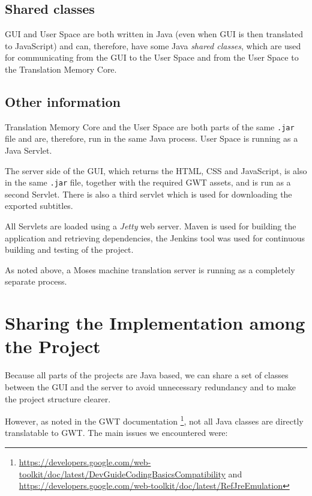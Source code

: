 \subsection*{Shared classes}

GUI and User Space are both written in Java (even when GUI is then translated to JavaScript) and can, therefore, have some Java \emph{shared classes}, which are used for communicating from the GUI to the User Space and from the User Space to the Translation Memory Core.


\subsection*{Other information}

Translation Memory Core and the User Space are both parts of the same \texttt{.jar} file and are, therefore, run in the same Java process. User Space is running as a Java Servlet.

The server side of the GUI, which returns the HTML, CSS and JavaScript, is also in the same \texttt{.jar} file, together with the required GWT assets, and is run as a second Servlet. There is also a third servlet which is used for downloading the exported subtitles.

All Servlets are loaded using a \emph{Jetty} web server. Maven is used for building the application and retrieving dependencies, the Jenkins tool was used for continuous building and testing of the project.

As noted above, a Moses machine translation server is running as a completely separate process.


\section{Sharing the Implementation among the Project}

Because all parts of the projects are Java based, we can share a set of classes between the GUI and the server to avoid unnecessary redundancy and to make the project structure clearer.

However, as noted in the GWT documentation \footnote{\url{https://developers.google.com/web-toolkit/doc/latest/DevGuideCodingBasicsCompatibility} and \url{https://developers.google.com/web-toolkit/doc/latest/RefJreEmulation}}, not all Java classes are directly translatable to GWT. The main issues we encountered were:

